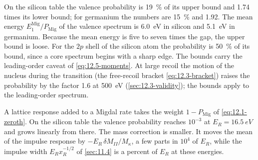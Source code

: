 On the silicon table the valence probability is \SI{19}{\percent} of its upper bound and 1.74 times its lower bound; for germanium the numbers are \SI{15}{\percent} and 1.92. The mean energy $E^{\mathrm{Mig}}_1/P_{\mathrm{Mig}}$ of the valence spectrum is \SI{6.0}{eV} in silicon and \SI{5.1}{eV} in germanium. Because the mean energy is five to seven times the gap, the upper bound is loose. For the $2p$ shell of the silicon atom the probability is \SI{50}{\percent} of its bound, since a core spectrum begins with a sharp edge. The bounds carry the leading-order caveat of \cref{eq:12.5-moments}. At large recoil the motion of the nucleus during the transition (the free-recoil bracket \cref{eq:12.3-bracket}) raises the probability by the factor 1.6 at \SI{500}{eV} (\cref{sec:12.3-validity}); the bounds apply to the leading-order spectrum.

A lattice response added to a Migdal rate takes the weight $1 - P_{\mathrm{Mig}}$ of \cref{eq:12.1-zeroth}. On the silicon table the valence probability reaches $10^{-3}$ at $E_R = \SI{16.5}{eV}$ and grows linearly from there. The mass correction is smaller. It moves the mean of the impulse response by $-E_R\,\delta M_{II}/M_\kappa$, a few parts in $10^4$ of $E_R$, while the impulse width $E_Rx_R^{-1/2}$ of \cref{sec:11.4} is a percent of $E_R$ at these energies.


